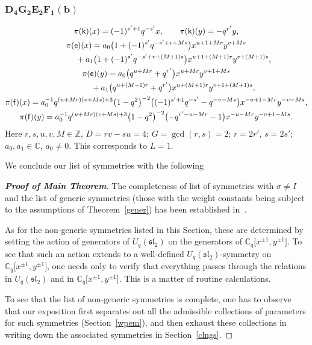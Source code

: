 \documentclass[10pt,a4paper]{amsart}
\numberwithin{equation}{section}
\begin{document}
\subsubsection*{$\boldsymbol{D_4G_2E_2F_1(b)}$}
\begin{gather*}
\pi(\mathsf{k})(x)= (-1)^{s'+1}q^{-s'}x ,\qquad\pi(\mathsf{k})(y)=-q^{r'}y ,\\
\pi(\mathsf{e})(x)= a_0\big(1+(-1)^{s'}q^{-s'+v+Ms}\big)x^{u+1+Mr}y^{v+Ms}\\
\hphantom{\pi(\mathsf{e})(x)=}{} + a_1\big(1+(-1)^{s'}q^{-s'+v+(M+1)s}\big)x^{u+1+(M+1)r}y^{v+(M+1)s} ,\\
\pi(\mathsf{e})(y)= a_0\big(q^{u+Mr}+q^{r'}\big)x^{u+Mr}y^{v+1+Ms}\\
\hphantom{\pi(\mathsf{e})(y)=}{}+ a_1\big(q^{u+(M+1)r}+q^{r'}\big)x^{u+(M+1)r}y^{v+1+(M+1)s} ,\\
 \pi(\mathsf{f})(x)= a_0^{-1}q^{(u+Mr)(v+Ms)+3}\big(1-q^2\big)^{-2}\big((-1)^{s'+1}q^{-s'}-q^{-v-Ms}\big)x^{-u+1-Mr}y^{-v-Ms} ,\\
\pi(\mathsf{f})(y)= a_0^{-1}q^{(u+Mr)(v+Ms)+3}\big(1-q^2\big)^{-2}\big({-}q^{r'-u-Mr}-1\big)x^{-u-Mr}y^{-v+1-Ms} .
\end{gather*}
Here $r,s,u,v,M\in\mathbb{Z}$, $D=rv-su=4$; $G=\operatorname{gcd}(r,s)=2$; $r=2r'$, $s=2s'$; $a_0,a_1\in\mathbb{C}$, $a_0\ne 0$. This corresponds to $L=1$.

We conclude our list of symmetries with the following


\begin{proof}[\bf Proof of Main Theorem] The completeness of list of symmetries with $\sigma\ne I$ and the list of generic symmetries (those with the weight constants being subject to the assumptions of Theorem~\ref{gener}) has been established in~\cite{S}.

As for the non-generic symmetries listed in this Section, these are determined by setting the action of generators of $U_q(\mathfrak{sl}_2)$ on the generators of $\mathbb{C}_q\big[x^{\pm 1},y^{\pm 1}\big]$. To see that such an action extends to a well-defined $U_q(\mathfrak{sl}_2)$-symmetry on $\mathbb{C}_q\big[x^{\pm 1},y^{\pm 1}\big]$, one needs only to verify that everything passes through the relations in $U_q(\mathfrak{sl}_2)$ and in $\mathbb{C}_q\big[x^{\pm 1},y^{\pm 1}\big]$. This is a matter of routine calculations.

To see that the list of non-generic symmetries is complete, one has to observe that our exposition first separates out all the admissible collections of parameters for such symmetries (Section~\ref{wpem}), and then exhaust these collections in writing down the associated symmetries in Section~\ref{clngs}.
\end{proof}
\end{document}
